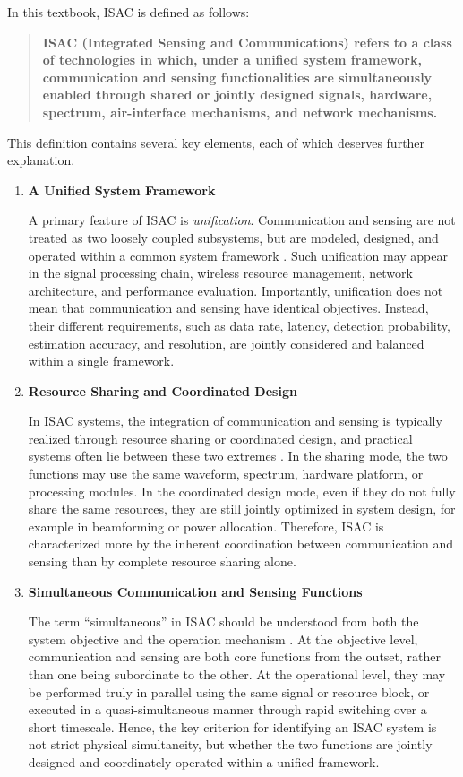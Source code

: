 In this textbook, ISAC is defined as follows:
\begin{quote}
\textbf{ISAC (Integrated Sensing and Communications) refers to a class of technologies in which, under a unified system framework, communication and sensing functionalities are simultaneously enabled through shared or jointly designed signals, hardware, spectrum, air-interface mechanisms, and network mechanisms.}
\end{quote}

This definition contains several key elements, each of which deserves further explanation.
\begin{enumerate}[label=(\arabic*)]
    \item \textbf{A Unified System Framework}
    
    A primary feature of ISAC is \emph{unification}. Communication and sensing are not treated as two loosely coupled subsystems, but are modeled, designed, and operated within a common system framework \cite{Liu2022ISAC,Zhang2021ISAC6G}. Such unification may appear in the signal processing chain, wireless resource management, network architecture, and performance evaluation. Importantly, unification does not mean that communication and sensing have identical objectives. Instead, their different requirements, such as data rate, latency, detection probability, estimation accuracy, and resolution, are jointly considered and balanced within a single framework.
    
    \item \textbf{Resource Sharing and Coordinated Design}
    \begin{sloppypar}
    In ISAC systems, the integration of communication and sensing is typically realized through resource sharing or coordinated design, and practical systems often lie between these two extremes \cite{Liu2020JointRadarComm,Gonzalez2024integrated}. In the sharing mode, the two functions may use the same waveform, spectrum, hardware platform, or processing modules. In the coordinated design mode, even if they do not fully share the same resources, they are still jointly optimized in system design, for example in beamforming or power allocation. Therefore, ISAC is characterized more by the inherent coordination between communication and sensing than by complete resource sharing alone.
    \end{sloppypar}
    \item \textbf{Simultaneous Communication and Sensing Functions}
    
    The term ``simultaneous'' in ISAC should be understood from both the system objective and the operation mechanism \cite{Liu2022ISAC}. At the objective level, communication and sensing are both core functions from the outset, rather than one being subordinate to the other. At the operational level, they may be performed truly in parallel using the same signal or resource block, or executed in a quasi-simultaneous manner through rapid switching over a short timescale. Hence, the key criterion for identifying an ISAC system is not strict physical simultaneity, but whether the two functions are jointly designed and coordinately operated within a unified framework.
    

\end{enumerate}
